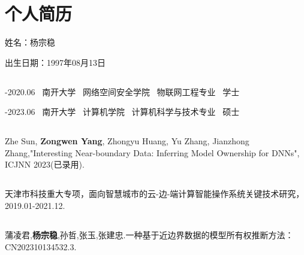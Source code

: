
\chapter*{个人简历}


\noindent 姓名：杨宗稳

\noindent 出生日期：1997年08月13日

\section*{}

-2020.06 \quad\ 南开大学 \quad\ 网络空间安全学院 \quad\ 物联网工程专业 \quad\ 学士

-2023.06 \quad\ 南开大学 \quad\ 计算机学院 \quad\ 计算机科学与技术专业 \quad\ 硕士

\section*{}

\noindent Zhe Sun, \textbf{Zongwen Yang}, Zhongyu Huang, Yu Zhang, Jianzhong Zhang,"Interesting Near-boundary Data: Inferring Model Ownership for DNNs", ICJNN 2023(已录用).

\section*{}

\noindent 天津市科技重大专项，面向智慧城市的云-边-端计算智能操作系统关键技术研究，2019.01-2021.12.

\section*{}

\noindent 蒲凌君,\textbf{杨宗稳},孙哲,张玉,张建忠.一种基于近边界数据的模型所有权推断方法：CN202310134532.3.


%




